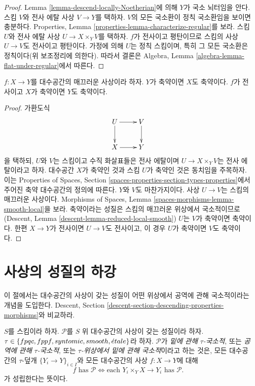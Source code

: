 \begin{proof}
Lemma \ref{lemma-descend-locally-Noetherian}에 의해 $Y$가 국소 뇌터임을
안다. 스킴 $V$와 전사 에탈 사상 $V\to Y$를 택하자. $V$의 모든
국소환이 정칙 국소환임을 보이면 충분하다. Properties, Lemma
\ref{properties-lemma-characterize-regular}를 보라. 스킴 $U$와 전사 에탈
사상 $U\to X\times_YV$를 택하자. $f$가 전사이고 평탄이므로 스킴의 사상
$U\to V$도 전사이고 평탄이다. 가정에 의해 $U$는 정칙 스킴이며, 특히
그 모든 국소환은 정칙이다(위 보조정리에 의한다). 따라서 결론은 Algebra,
Lemma \ref{algebra-lemma-flat-under-regular}에서 따른다.
\end{proof}

\begin{lemma}
\label{lemma-reduced-local-smooth}
$f:X\to Y$를 대수공간의 매끄러운 사상이라 하자. $Y$가 축약이면 $X$도
축약이다. $f$가 전사이고 $X$가 축약이면 $Y$도 축약이다.
\end{lemma}

\begin{proof}
가환도식
$$
\xymatrix{
U \ar[d] \ar[r] & V \ar[d] \\
X \ar[r] & Y
}
$$
을 택하되, $U$와 $V$는 스킴이고 수직 화살표들은 전사 에탈이며
$U\to X\times_YV$는 전사 에탈이라고 하자. 대수공간 $X$가 축약인 것과
스킴 $U$가 축약인 것은 동치임을 주목하자. 이는 Properties of Spaces,
Section \ref{spaces-properties-section-types-properties}에서 주어진 축약
대수공간의 정의에 따른다. $Y$와 $V$도 마찬가지이다.
사상 $U\to V$는 스킴의 매끄러운 사상이다. Morphisms of Spaces, Lemma
\ref{spaces-morphisms-lemma-smooth-local}을 보라. 축약이라는 성질은 스킴의
매끄러운 위상에서 국소적이므로(Descent, Lemma
\ref{descent-lemma-reduced-local-smooth}) $U$는 $V$가 축약이면
축약이다. 한편 $X\to Y$가 전사이면 $U\to V$도 전사이고, 이 경우
$U$가 축약이면 $V$도 축약이다.
\end{proof}

\section{사상의 성질의 하강}
\label{section-descending-properties-morphisms}

\noindent
이 절에서는 대수공간의 사상이 갖는 성질이 어떤 위상에서 공역에 관해
국소적이라는 개념을 도입한다. Descent, Section
\ref{descent-section-descending-properties-morphisms}와 비교하라.

\begin{definition}
\label{definition-property-morphisms-local}
$S$를 스킴이라 하자. $\mathcal{P}$를 $S$ 위 대수공간의 사상이 갖는
성질이라 하자. $\tau\in\{fpqc,fppf,syntomic,smooth,{\acute{e}tale}\}$라 하자.
$\mathcal{P}$가 {\it 밑에 관해 $\tau$-국소적}, 또는
{\it 공역에 관해 $\tau$-국소적}, 또는 {\it $\tau$-위상에서 밑에 관해
국소적}이라고 하는 것은, 모든 대수공간의 $\tau$-덮개
$\{Y_i\to Y\}_{i\in I}$와 모든 대수공간의 사상 $f:X\to Y$에 대해
$$
f \text{ has }\mathcal{P}
\Leftrightarrow
\text{each }Y_i \times_Y X \to Y_i\text{ has }\mathcal{P}.
$$
가 성립한다는 뜻이다.
\end{definition}

